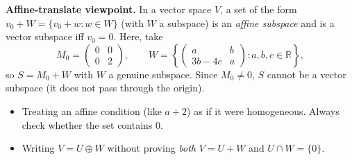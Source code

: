 \begin{policynote}[title={Extension (Tutorial 1, Question 6, Method 1)}]
\textbf{Affine-translate viewpoint.}
In a vector space $V$, a set of the form $v_0+W=\{v_0+w:w\in W\}$ (with $W$ a subspace) is an \emph{affine subspace} and is a vector subspace iff $v_0=0$.
Here, take
\[
M_0=\begin{pmatrix}0&0\\0&2\end{pmatrix},\qquad
W=\left\{\begin{pmatrix}a&b\\3b-4c&a\end{pmatrix}:a,b,c\in\mathbb{R}\right\},
\]
so $S=M_0+W$ with $W$ a genuine subspace. Since $M_0\neq 0$, $S$ cannot be a vector subspace (it does not pass through the origin).
\end{policynote}

\begin{commonmistake}
\begin{itemize}
\item Treating an affine condition (like $a+2$) as if it were homogeneous. Always check whether the set contains $0$.
\item Writing $V=U\oplus W$ without proving \emph{both} $V=U+W$ and $U\cap W=\{0\}$.
\end{itemize}
\end{commonmistake}

